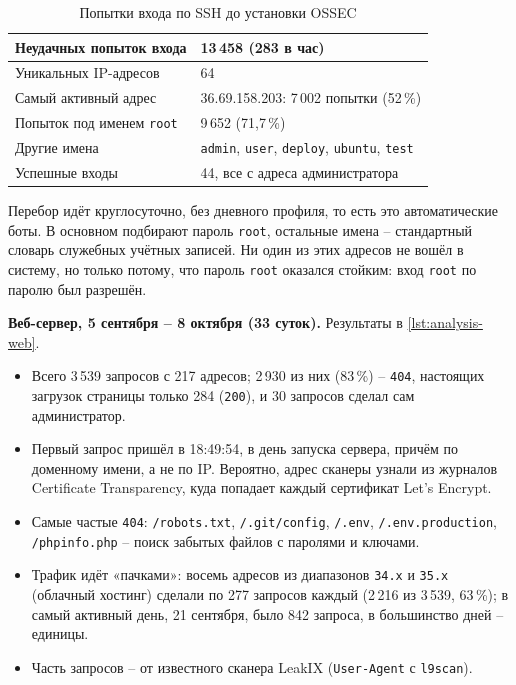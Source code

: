 \begin{table}[H]
\centering
\small
\begin{tabular}{|p{7cm}|p{6cm}|}
\hline
Неудачных попыток входа & 13\,458 (283 в час) \\
\hline
Уникальных IP-адресов & 64 \\
\hline
Самый активный адрес & 36.69.158.203: 7\,002 попытки (52\,\%) \\
\hline
Попыток под именем \texttt{root} & 9\,652 (71,7\,\%) \\
\hline
Другие имена & \texttt{admin}, \texttt{user}, \texttt{deploy}, \texttt{ubuntu}, \texttt{test} \\
\hline
Успешные входы & 44, все с адреса администратора \\
\hline
\end{tabular}
\caption{Попытки входа по SSH до установки OSSEC}
\end{table}


Перебор идёт круглосуточно, без дневного профиля, то есть это
автоматические боты. В основном подбирают пароль \texttt{root}, остальные
имена -- стандартный словарь служебных учётных записей. Ни один из этих
адресов не вошёл в систему, но только потому, что пароль \texttt{root}
оказался стойким: вход \texttt{root} по паролю был разрешён.

\textbf{Веб-сервер, 5 сентября -- 8 октября (33 суток).} Результаты в
\autoref{lst:analysis-web}.

\begin{itemize}
  \item Всего 3\,539 запросов с 217 адресов; 2\,930 из них (83\,\%) --
  \texttt{404}, настоящих загрузок страницы только 284 (\texttt{200}), и
  30 запросов сделал сам администратор.
  \item Первый запрос пришёл в 18:49:54, в день запуска сервера, причём
  по доменному имени, а не по IP. Вероятно, адрес сканеры узнали из
  журналов Certificate Transparency, куда попадает каждый сертификат
  Let's Encrypt.
  \item Самые частые \texttt{404}: \texttt{/robots.txt},
  \texttt{/.git/config}, \texttt{/.env}, \texttt{/.env.production},
  \texttt{/phpinfo.php} -- поиск забытых файлов с паролями и ключами.
  \item Трафик идёт «пачками»: восемь адресов из диапазонов
  \texttt{34.x} и \texttt{35.x} (облачный хостинг) сделали по 277
  запросов каждый (2\,216 из 3\,539, 63\,\%); в самый активный день,
  21 сентября, было 842 запроса, в большинство дней -- единицы.
  \item Часть запросов -- от известного сканера LeakIX
  (\texttt{User-Agent} с \texttt{l9scan}).
\end{itemize}

